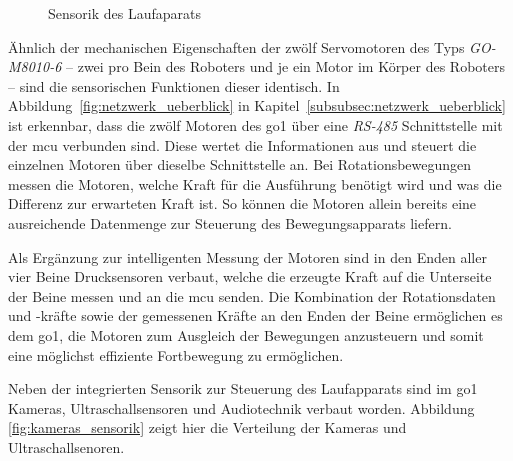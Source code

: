 \begin{figure}[h]
    \caption{Sensorik des Laufaparats}\label{fig:laufapparat}
\end{figure}

Ähnlich der mechanischen Eigenschaften der zwölf Servomotoren des Typs \emph{GO-M8010-6} -- zwei pro Bein des Roboters 
und je ein Motor im Körper des Roboters  -- sind die sensorischen Funktionen dieser identisch.
In Abbildung~\ref{fig:netzwerk_ueberblick} in Kapitel~\ref{subsubsec:netzwerk_ueberblick} ist erkennbar, dass die
zwölf Motoren des \gls{go1} über eine \emph{RS-485} Schnittstelle mit der \gls{mcu} verbunden sind.
Diese wertet die Informationen aus und steuert die einzelnen Motoren über dieselbe Schnittstelle an.
Bei Rotationsbewegungen messen die Motoren, welche Kraft für die Ausführung benötigt wird und was die Differenz zur
erwarteten Kraft ist.
So können die Motoren allein bereits eine ausreichende Datenmenge zur Steuerung des Bewegungsapparats liefern.

Als Ergänzung zur intelligenten Messung der Motoren sind in den Enden aller vier Beine  Drucksensoren verbaut, welche
die erzeugte Kraft auf die Unterseite der Beine messen und an die \gls{mcu} senden.
Die Kombination der Rotationsdaten und -kräfte sowie der gemessenen Kräfte an den Enden der Beine ermöglichen es dem
\gls{go1}, die Motoren zum Ausgleich der Bewegungen anzusteuern und somit eine möglichst effiziente Fortbewegung zu
ermöglichen.

Neben der integrierten Sensorik zur Steuerung des Laufapparats sind im \gls{go1} Kameras, Ultraschallsensoren und
Audiotechnik verbaut worden.
Abbildung \ref{fig:kameras_sensorik} zeigt hier die Verteilung der Kameras und Ultraschallsenoren.

